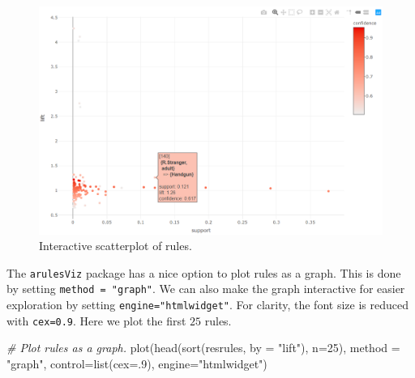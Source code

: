 \documentclass[
  11pt,
]{krantz}
\newenvironment{Shaded}{\begin{snugshade}}{\end{snugshade}}
\newcommand{\AttributeTok}[1]{\textcolor[rgb]{0.61,0.61,0.61}{#1}}
\newcommand{\CommentTok}[1]{\textcolor[rgb]{0.37,0.37,0.37}{\textit{#1}}}
\newcommand{\DecValTok}[1]{\textcolor[rgb]{0.06,0.06,0.06}{#1}}
\newcommand{\FunctionTok}[1]{\textcolor[rgb]{0,0,0}{#1}}
\newcommand{\NormalTok}[1]{#1}
\newcommand{\StringTok}[1]{\textcolor[rgb]{0.5,0.5,0.5}{#1}}
\begin{document}
\begin{figure}

{\centering \includegraphics[width=0.9\linewidth]{images/rules_scatter_int} 

}

\caption{Interactive scatterplot of rules.}\label{fig:rulesScatterInt}
\end{figure}

The \texttt{arulesViz} package has a nice option to plot rules as a graph. This is done by setting \texttt{method\ =\ "graph"}. We can also make the graph interactive for easier exploration by setting \texttt{engine="htmlwidget"}. For clarity, the font size is reduced with \texttt{cex=0.9}. Here we plot the first \(25\) rules.

\begin{Shaded}
\begin{Highlighting}[]
\CommentTok{\# Plot rules as a graph.}
\FunctionTok{plot}\NormalTok{(}\FunctionTok{head}\NormalTok{(}\FunctionTok{sort}\NormalTok{(resrules, }\AttributeTok{by =} \StringTok{"lift"}\NormalTok{), }\AttributeTok{n=}\DecValTok{25}\NormalTok{),}
     \AttributeTok{method =} \StringTok{"graph"}\NormalTok{,}
     \AttributeTok{control=}\FunctionTok{list}\NormalTok{(}\AttributeTok{cex=}\NormalTok{.}\DecValTok{9}\NormalTok{),}
     \AttributeTok{engine=}\StringTok{"htmlwidget"}\NormalTok{)}
\end{Highlighting}
\end{Shaded}
\end{document}
